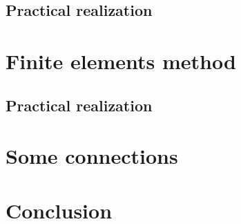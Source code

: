 \documentclass[professionalfonts, xcolor=dvipsnames, mathsans, 11pt, uncompressed]{beamer}
\begin{document}
\subsection{Practical realization}




\section{Finite elements method}

	




\subsection{Practical realization}



\section{Some connections}


\section{Conclusion}

\end{document}
